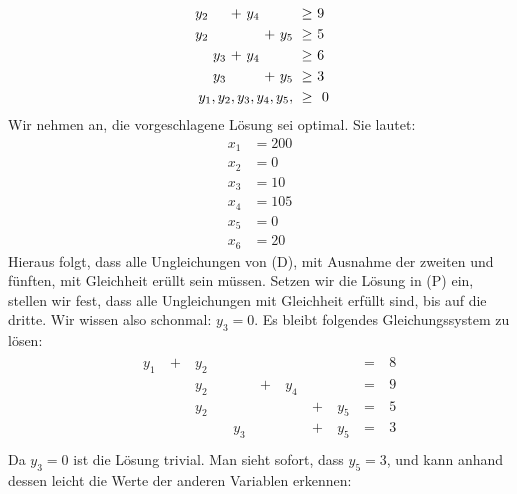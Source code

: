 \documentclass [a4paper,11pt]{article}
\begin{document}
\begin{enumerate}
\begin{enumerate}
\begin{align*}
\begin{alignedat}{10}
                    &&  & &\ y_2 & & &\ + &\ y_4 & & &\ \geq &\ 9\ \\
                    &&  & &\ y_2 & & & & &\ + &\ y_5 &\ \geq &\ 5\ \\
                    && & & & &\ y_3 &\ + &\ y_4 & & &\ \geq &\ 6\ \\
                    && & & & &\ y_3 & & &\ + &\ y_5 &\ \geq &\ 3\ \\
                    && & & & & & & & & \llap{$y_1,y_2,y_3,y_4,y_5,$} &\ \geq &\ 0
                    \end{alignedat}
                    \end{align*}
                    Wir nehmen an, die vorgeschlagene Lösung sei optimal. Sie lautet:
                    \begin{align*}
                        x_1 &= 200\\
                        x_2 &= 0\\
                        x_3 &= 10\\
                        x_4 &= 105\\
                        x_5 &= 0\\
                        x_6 &= 20
                    \end{align*}
                    Hieraus folgt, dass alle Ungleichungen von (D), mit Ausnahme der zweiten und fünften, mit Gleichheit erüllt sein müssen. Setzen wir die
                    Lösung in (P) ein, stellen wir fest, dass alle Ungleichungen mit Gleichheit erfüllt sind, bis auf die dritte. Wir wissen also schonmal:
                    $y_3 = 0$. Es bleibt folgendes Gleichungssystem zu lösen:
                    \begin{align*}
                    \begin{alignedat}{10}
                    && y_1 &\ + &\ y_2 & & & & & & &\ = &\ 8\ \\
                    &&     &    &\ y_2 & & &\ + &\ y_4 & & &\ = &\ 9\ \\
                    &&     &    &\ y_2 & & & & &\ + &\ y_5 &\ = &\ 5\ \\
                    &&     &    & & &\ y_3 & & &\ + &\ y_5 &\ = &\ 3\ \\
                    \end{alignedat}
                    \end{align*}
                    Da $y_3 = 0$ ist die Lösung trivial. Man sieht sofort, dass $y_5 = 3$, und kann anhand dessen leicht die Werte der anderen Variablen erkennen:

\end{enumerate}
\end{enumerate}
\end{document}
